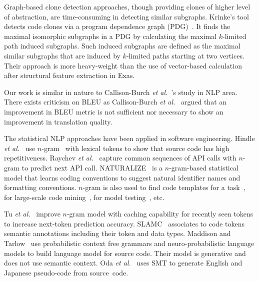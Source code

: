 Graph-based clone detection approaches, though providing clones
of higher level of abstraction, are time-consuming in detecting
similar subgraphs. Krinke's tool detects code clones via a program
dependence graph (PDG)~\cite{krinke01}. It finds the maximal
isomorphic subgraphs in a PDG by calculating the maximal $k$-limited
path induced subgraphs. Such induced subgraphs are defined as the
maximal similar subgraphs that are induced by $k$-limited paths
starting at two vertices. Their approach is more heavy-weight than the use
of vector-based calculation after structural feature extraction in Exas.




Our work is similar in nature to Callison-Burch {\em et
  al.}~\cite{Callison}'s study in NLP area. There exists criticism on
BLEU as Callison-Burch {\em et al.}~\cite{Callison} argued that an
improvement in BLEU metric is not sufficient nor necessary to show an
improvement in translation quality.


The statistical NLP approaches have been applied in software
engineering. Hindle {\em et al.}~\cite{natural} use
$n$-gram~\cite{manning99} with lexical tokens to show that source code
has high repetitiveness. 
%
Raychev {\em et al.}~\cite{ethz-pldi14} capture common sequences of
API calls with $n$-gram to predict next API call.
NATURALIZE~\cite{barr-codeconvention-fse14} is a $n$-gram-based
statistical model that learns coding conventions to suggest natural
identifier names and formatting conventions.  $n$-gram is also used to
find code templates for a task~\cite{jacob10}, for large-scale
code mining~\cite{sutton-msr13}, for model
testing~\cite{tonella-icse14}, etc.

Tu {\em et al.}~\cite{tu-fse14} improve $n$-gram model with caching
capability for recently seen tokens to increase next-token prediction
accuracy.
%
SLAMC~\cite{fse13} associates to code tokens semantic
annotations including their token and data types.
%
Maddison and Tarlow~\cite{tarlow14} use probabilistic context free
grammars and neuro-probabilistic language models to build language
model for source code. Their model is generative and does not use
semantic context. Oda {\em et al.}~\cite{hide-ase15} uses SMT to
generate English and Japanese pseudo-code from source~code.
